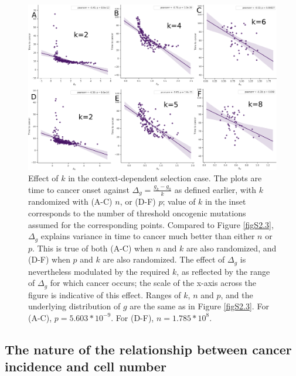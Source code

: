 \documentclass[9pt,twocolumn,twoside]{pnas-new}
\begin{document}
		\begin{figure}[tbhp]
			\centering
			\includegraphics[width=\linewidth, keepaspectratio=true]{figS2-4.png}
			\caption{Effect of $k$ in the context-dependent selection case. The plots are time to cancer onset against $\Delta_{g} = \frac{g_{k}-g_{0}}{k}$ as defined earlier, with $k$ randomized with (A-C) $n$, or (D-F) $p$; value of $k$ in the inset corresponds to the number of threshold oncogenic mutations assumed for the corresponding points. Compared to Figure \ref{figS2.3}, $\Delta_{g}$ explains variance in time to cancer much better than either $n$ or $p$. This is true of both (A-C) when $n$ and $k$ are also randomized, and (D-F) when $p$ and $k$ are also randomized. The effect of $\Delta_{g}$ is nevertheless modulated by the required $k$, as reflected by the range of $\Delta_{g}$ for which cancer occurs; the scale of the x-axis across the figure is indicative of this effect. Ranges of $k$, $n$ and $p$, and the underlying distribution of $g$ are the same as in Figure \ref{figS2.3}. For (A-C), $p=5.603*10^{-9}$. For (D-F), $n=1.785*10^{8}$.}
			\label{figS2.4}
		\end{figure}

	\subsection{The nature of the relationship between cancer incidence and cell number}\label{S3 Text}
		\renewcommand{\thefigure}{S3.\arabic{figure}}
		\setcounter{figure}{0}

		\renewcommand{\thetable}{S3.\arabic{table}}
		\setcounter{table}{0}
\end{document}
